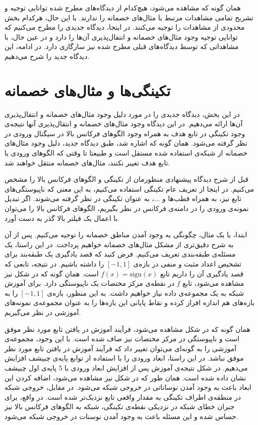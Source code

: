 \documentclass[12pt,onecolumn,a4paper]{article}
\begin{document}
همان گونه که مشاهده می‌شود، هیچ‌کدام از دیدگاه‌های مطرح شده توانایی توجیه و تشریح تمامی مشاهدات مرتبط با مثال‌های خصمانه را ندارند. با این حال، هرکدام بخش محدودی از مشاهدات را توجیه می‌کنند. در اینجا، دیدگاه جدیدی را مطرح می‌کنیم که توانایی توجیه وجود مثال‌های خصمانه و انتقال‌پذیری آن‌ها را دارد و  در عین حال، با مشاهداتی که توسط دیدگاه‌های قبلی مطرح شده نیز سازگازی دارد. در ادامه، این دیدگاه جدید را شرح می‌دهیم.

\section{تکینگی‌ها و مثال‌های خصمانه}
در این بخش، دیدگاه جدیدی را در مورد دلیل وجود مثال‌های خصمانه و انتقال‌پذیری آن‌ها ارائه می‌دهیم. در این دیدگاه وجود مثال‌های خصمانه و انتقال‌پذیری آنها نتیجه‌ی وجود تکینگی در تابع هدف به همراه وجود الگوهای فرکانس بالا در سیگنال ورودی در نظر گرفته می‌شود. همان گونه که اشاره شد، طبق دیدگاه جدید، دلیل وجود مثال‌های خصمانه از شبکه‌ی استفاده شده مستقل است و طبیعتا تا وقتی که الگوهای ورودی یا تابع هدف تغییر نکنند، مثال‌های خصمانه منتقل خواهند شد.

قبل از شرح دیدگاه پیشنهادی منظورمان از تکینگی و الگوهای فرکانس بالا را مشخص می‌کنیم. در اینجا از تعریف عام تکینگی استفاده می‌کنیم، به این معنی که ناپیوستگی‌های تابع نیز، به همراه قطب‌ها و ...، به عنوان تکینگی  در نظر گرفته می‌شوند. اگر تبدیل نمونه‌ی ورودی را در دامنه‌ی فرکانس در نظر بگیریم، الگوهای فرکانس بالا را می‌توان با اعمال یک  فیلتر بالا گذر به دست آورد.

ابتدا، با یک مثال، چگونگی به وجود آمدن مناطق خصمانه را توجیه می‌کنیم. پس از آن به شرح دقیق‌تری از مشکل مثال‌های خصمانه خواهیم پرداخت. در این راستا، یک مسئله‌ی طبقه‌بندی تعریف می‌کنیم. فرض کنید که قصد یادگیری یک طبقه‌بند برای تشخیص اعداد مثبت و منفی در بازه‌ی 
$[-1,1]$ 
را داشته باشیم. در نتیجه، تابعی که قصد یادگیری آن را داریم تابع 
$f(x)=\mathrm{sign}(x)$ 
است. همان گونه که در شکل نیز مشاهده می‌شود، تابع 
$f$ 
در نقطه‌ی مرکز مختصات یک ناپیوستگی دارد. برای آموزش شبکه به یک مجموعه‌ی داده نیاز خواهیم داشت. به این منظور، بازه‌ی 
$[-1,1]$ 
را به بازه‌های هم اندازه افراز کرده و نقاط پایانی این بازه‌ها را به عنوان مجموعه‌ی نمونه‌های آموزشی در نظر می‌گیریم.

همان گونه که در شکل مشاهده می‌شود، فرآیند آموزش در یافتن تابع مورد نظر موفق است و ناپیوستگی در مرکز مختصات نیز صاف شده است. با این وجود، مجموعه‌ی آموزشی را به گونه‌ای می‌توان تغییر داد که فرآیند آموزش در یافتن تابع مورد نظر موفق نباشد. در این راستا، ابعاد ورودی را با استفاده از توابع  پایه‌ی چبیشف افزایش می‌دهیم. در شکل نتیجه‌ی آموزش پس از افزایش ابعاد ورودی با 5 پایه‌ی اول چبیشف نشان داده شده است. همان طور که در شکل نیز مشاهده می‌شود، اضافه کردن این ابعاد باعث به وجود آمدن نوساناتی در خروجی شبکه می‌شود. در مقابل، خروجی شبکه در منطقه‌ی اطراف تکینگی به مقدار واقعی تابع نزدیک‌تر شده است. در واقع، برای جبران خطای شبکه در نزدیکی نقطه‌ی تکینگی، شبکه به الگوهای فرکانس بالا نیز حساس شده و این مسئله باعث به وجود آمدن نوسنات در خروجی شبکه می‌شود.
\end{document}
